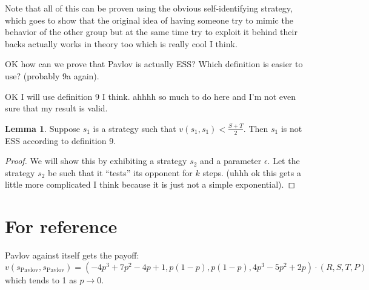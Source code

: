 \documentclass[11pt]{amsart}
\theoremstyle{definition}
\newtheorem{lemma}{Lemma}
\theoremstyle{remark}
\begin{document}
Note that all of this can be proven using the obvious self-identifying strategy, which goes to show that the original idea of having someone try to mimic the behavior of the other group but at the same time try to exploit it behind their backs actually works in theory too which is really cool I think.

OK how can we prove that Pavlov is actually ESS? Which definition is easier to use? (probably 9a again).



OK I will use definition 9 I think. ahhhh so much to do here and I'm not even sure that my result is valid.







\begin{lemma}
  Suppose $s_1$ is a strategy such that $v(s_1,s_1) < \frac{S + T}{2}$. Then $s_1$ is not ESS according to definition 9.
\end{lemma}
\begin{proof}
  We will show this by exhibiting a strategy $s_2$ and a parameter $\epsilon$. Let the strategy $s_2$ be such that it ``tests'' its opponent for $k$ steps. (uhhh ok this gets a little more complicated I think because it is just not a simple exponential).
\end{proof}






\section*{For reference}

Pavlov against itself gets the payoff: \begin{equation*}
  v(s_\text{Pavlov}, s_\text{Pavlov}) = (-4p^3+7p^2-4p+1, p(1-p), p(1-p), 4p^3-5p^2+2p) \cdot (R, S, T, P)
\end{equation*}
which tends to 1 as $p \to 0$.
\end{document}
